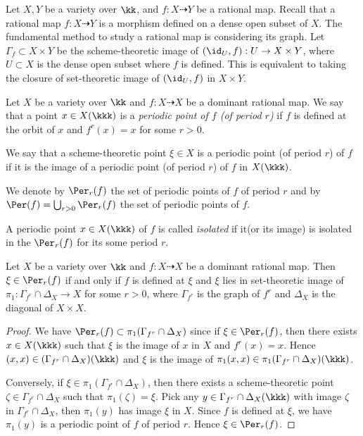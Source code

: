   Let $X,Y$ be a variety over $\kk$, and $f: X \dashrightarrow Y$ be a rational map.
  Recall that a rational map $f: X \dashrightarrow Y$ is a morphism defined on a dense open subset of $X$.
  The fundamental method to study a rational map is considering its graph.
  Let $\Gamma_f \subset X \times Y$ be the scheme-theoretic image of $(\id_U, f): U \to X \times Y$, where $U \subset X$ is the dense open subset where $f$ is defined.
  This is equivalent to taking the closure of set-theoretic image of $(\id_U, f)$ in $X \times Y$.
  
  \begin{definition}
    Let $X$ be a variety over $\kk$ and $f: X \dashrightarrow X$ be a dominant rational map.
    We say that a point $x \in X(\kkk)$ is a \emph{periodic point of $f$ (of period $r$)} if $f$ is defined at the orbit of $x$ and $f^r(x) = x$ for some $r > 0$.

    We say that a scheme-theoretic point $\xi \in X$ is a periodic point (of period $r$) of $f$ if it is the image of a periodic point (of period $r$) of $f$ in $X(\kkk)$.

    We denote by $\Per_r(f)$ the set of periodic points of $f$ of period $r$ and by $\Per(f) = \bigcup_{r > 0} \Per_r(f)$ the set of periodic points of $f$.

    A periodic point $x \in X(\kkk)$ of $f$ is called \emph{isolated} if it(or its image) is isolated in the $\Per_r(f)$ for its some period $r$.
  \end{definition}

  \begin{proposition}
    Let $X$ be a variety over $\kk$ and $f: X \dashrightarrow X$ be a dominant rational map.
    Then $\xi \in \Per_r(f)$ if and only if $f$ is defined at $\xi$ and $\xi$ lies in set-theoretic image of $\pi_1: \Gamma_{f^r} \cap \Delta_X \to X$ for some $r > 0$, where $\Gamma_{f^r}$ is the graph of $f^r$ and $\Delta_X$ is the diagonal of $X \times X$.
  \end{proposition}
  \begin{proof}
    We have $\Per_r(f) \subset \pi_1(\Gamma_{f^r} \cap \Delta_X)$ since if $\xi \in \Per_r(f)$, then there exists $x \in X(\kkk)$ such that $\xi$ is the image of $x$ in $X$ and $f^r(x) = x$.
    Hence $(x,x) \in (\Gamma_{f^r} \cap \Delta_X)(\kkk)$ and $\xi$ is the image of $\pi_1(x,x) \in \pi_1(\Gamma_{f^r} \cap \Delta_X)(\kkk)$.

    Conversely, if $\xi \in \pi_1(\Gamma_{f^r} \cap \Delta_X)$, then there exists a scheme-theoretic point $\zeta \in \Gamma_{f^r} \cap \Delta_X$ such that $\pi_1(\zeta) = \xi$.
    Pick any $y \in \Gamma_{f^r} \cap \Delta_X(\kkk)$ with image $\zeta$ in $\Gamma_{f^r} \cap \Delta_X$, then $\pi_1(y)$ has image $\xi$ in $X$.
    Since $f$ is defined at $\xi$, we have $\pi_1(y)$ is a periodic point of $f$ of period $r$.
    Hence $\xi \in \Per_r(f)$.
  \end{proof}

